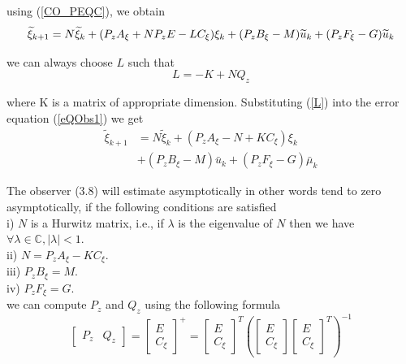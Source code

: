 \documentclass[letterpaper, 10 pt, conference]{ieeeconf}  %
\begin{document}
using (\ref{CO_PEQC}), we obtain 
\begin{equation}\label{eQObs1}
 \widetilde{\xi}_{k+1}=N\widetilde\xi_{k}+(P_{z}A_{\xi}+N P_{z}E \\
 -L C_{\xi})\xi_{k}+(P_{z}B_{\xi}-M)\widetilde{u}_{k}+(P_{z}F_{\xi}-G)\widetilde{u}_{k}
\end{equation}

we can always choose $L$ such that
\begin{equation}\label{L}
    L = -K + NQ_z
\end{equation}

where K is a matrix of appropriate dimension. Substituting (\ref{L}) into the error equation (\ref{eQObs1}) we get
\begin{align*}
    \tilde{\xi}_{k+1}&=N \tilde{\xi}_k+\left(P_z A_{\xi}-N+K C_{\xi}\right) \xi_k\\
    &+\left(P_z B_{\xi}-M\right) \bar{u}_k+\left(P_z F_{\xi}-G\right) \bar{\mu}_k
\end{align*}


The observer (3.8) will estimate asymptotically  in other words tend to zero asymptotically, if the following conditions are satisfied\\

i) $N$ is a Hurwitz matrix, i.e., if $\lambda$ is the eigenvalue of $N$ then we have $\forall \lambda \in \mathbb{C},|\lambda|<1$.\\
ii) $N=P_z A_{\xi}-K C_{\xi}$.\\
iii) $P_z B_{\xi}=M$.\\
iv) $P_z F_{\xi}=G$.\\


we can compute $P_z$ and $Q_z$  using the following formula
\begin{equation}
    \left[\begin{array}{ll}
    P_z & Q_z
    \end{array}\right]=\left[\begin{array}{l}
    E \\
    C_{\xi}
    \end{array}\right]^{+}=\left[\begin{array}{c}
    E \\
    C_{\xi}
    \end{array}\right]^T\left(\left[\begin{array}{c}
    E \\
    C_{\xi}
    \end{array}\right]\left[\begin{array}{c}
    E \\
    C_{\xi}
    \end{array}\right]^T\right)^{-1}
\end{equation}
\end{document}

